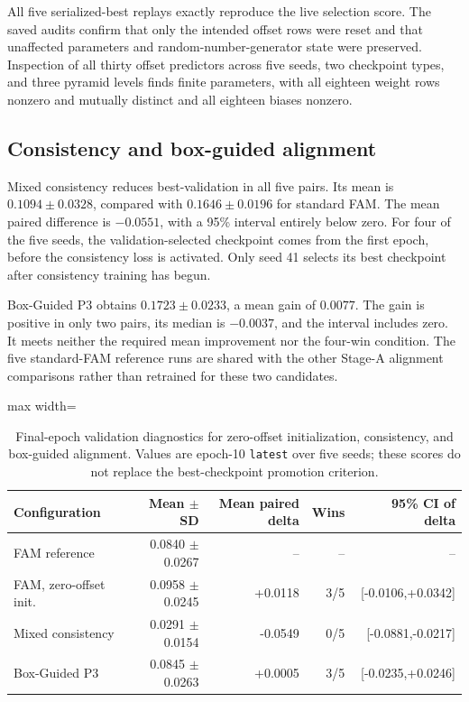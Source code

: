 All five serialized-best replays exactly reproduce the live selection score.
The saved audits confirm that only the intended offset rows were reset and
that unaffected parameters and random-number-generator state were preserved.
Inspection of all thirty offset predictors across five seeds, two checkpoint
types, and three pyramid levels finds finite parameters, with all eighteen
weight rows nonzero and mutually distinct and all eighteen biases nonzero.

\subsection{Consistency and box-guided alignment}

Mixed consistency reduces best-validation \mapfifty{} in all five pairs.
Its mean is \(0.1094\pm0.0328\), compared with \(0.1646\pm0.0196\) for
standard FAM. The mean paired difference is \(-0.0551\), with a 95\%
interval entirely below zero. For four of the five seeds, the
validation-selected checkpoint comes from the first epoch, before the
consistency loss is activated. Only seed 41 selects its best checkpoint
after consistency training has begun.

Box-Guided P3 obtains \(0.1723\pm0.0233\), a mean gain of \(0.0077\).
The gain is positive in only two pairs, its median is \(-0.0037\), and the
interval includes zero. It meets neither the required mean improvement nor
the four-win condition. The five standard-FAM reference runs are shared with
the other Stage-A alignment comparisons rather than retrained for these two
candidates.

\begin{table}[htbp]
  \centering
  \caption{Final-epoch validation diagnostics for zero-offset initialization,
  consistency, and box-guided alignment. Values are epoch-10 \texttt{latest}
  \mapfifty{} over five seeds; these scores do not replace the best-checkpoint
  promotion criterion.}
  \label{tab:stage-a-five-seed-latest}
  \begin{adjustbox}{max width=\textwidth}
  \begin{tabular}{lrrrr}
    \toprule
    Configuration & Mean \(\pm\) SD & Mean paired delta & Wins & 95\% CI of delta \\
    \midrule
    FAM reference & 0.0840 \(\pm\) 0.0267 & -- & -- & -- \\
    FAM, zero-offset init. & 0.0958 \(\pm\) 0.0245 & +0.0118 & 3/5 & [-0.0106,+0.0342] \\
    Mixed consistency & 0.0291 \(\pm\) 0.0154 & -0.0549 & 0/5 & [-0.0881,-0.0217] \\
    Box-Guided P3 & 0.0845 \(\pm\) 0.0263 & +0.0005 & 3/5 & [-0.0235,+0.0246] \\
    \bottomrule
  \end{tabular}
  \end{adjustbox}
\end{table}

